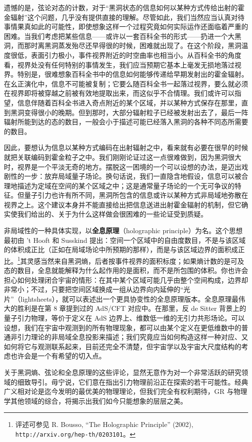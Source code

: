 遗憾的是，弦论对态的计数，对于“黑洞状态的信息如何以某种方式传给出射的霍金辐射”这个问题，几乎没有提供直接的理解。尽管如此，我们当然应当认真对待事情果真如此的可能性，即使想象这样一个过程究竟如何实际运作还面临着严重的困难。当我们考虑把某些信息——或许以一套百科全书的形式——扔进一个大黑洞，而那时离黑洞蒸发殆尽还早得很的时候，困难就出现了。在这个阶段，黑洞温度很低，表面引力极小，事件视界附近的时空曲率也相当小。从百科全书的角度看，视界处没有任何特别的事情发生，我们应当预期它基本上毫发无损地落过视界。特别是，很难想象百科全书中的信息如何能够传递给早期发射出的霍金辐射。在幺正演化中，信息不可能被复制；它要么随百科全书一起落过视界，要么就必须在视界即将被穿越之前被有效地提取出来，而这似乎不合情理。我们或许可以指望，信息伴随着百科全书进入奇点附近的某个区域，并以某种方式保存在那里，直到黑洞变得很小的晚期。但到那时，大部分辐射粒子已经被发射出去了，最后一阵辐射所能到达的态的数目，一般会小于描述可能已经落入黑洞的各种不同态所需要的数目。

因此，要想认为信息以某种方式编码在出射辐射之中，看来就有必要在很早的时候就把关联编码到霍金粒子之中。我们刚刚论证过这一点很难做到，因为黑洞很大时，视界是一个平淡无奇的地方。摆脱这一困境的一个可以设想的办法，是迈出戏剧性的一步：放弃局域量子场论。换句话说，我们一直隐含地假设，信息可以被合理地描述为定域在空间的某个区域之中；这是通常量子场论的一个无可争议的特征。但量子引力也许有所不同，黑洞所包含的信息或许以某种方式非局域地弥散在视界之上。这个建议本身并不能直接给出把信息送进出射霍金辐射的机制，但它确实使我们给出的、关于为什么这样做会很困难的一些论证受到质疑。

非局域性的一种具体实现，以\textbf{全息原理}（holographic principle）为名。这个思想最初由 't Hooft 和 Susskind 提出：空间一个区域中的自由度数目，不是与该区域的体积成正比（正如在局域场论中所预期的那样），而是与该区域边界的面积成正比。\footnote{评述可参见 R. Bousso, “The Holographic Principle” (2002), \texttt{http://arxiv.org/hep-th/0203101}。}其灵感当然来自黑洞熵，后者按事件视界的面积标度；如果熵计数的是可及态的数目，全息就能解释为什么起作用的是面积，而不是所包围的体积。你也许会担心如何处理闭合宇宙的情形：在其中某个区域可能几乎由整个空间构成，边界却非常小；不过，只要把空间区域换成一组从边界向内延伸的“光片”（lightsheets），就可以表述出一个更具协变性的全息原理版本。全息原理最伟大的胜利是在第 8 章提到过的 AdS/CFT 对应中。在那里，反 de Sitter 背景上的量子引力物理，等价于定义在 AdS 边界上、维数低一维的无引力共形场论。可以设想，我们在宇宙中观测到的所有物理现象，都可以由某个定义在更低维数中的普通非引力理论的非局域全息投影来描述；我们究竟应当如何构造这样一种对应、又如何将它与观测联系起来，目前还完全不清楚，但宇宙学以及宇宙大尺度结构的考虑也许会是一个有希望的切入点。

关于黑洞熵、弦论和全息原理的这些评论，显然无意作为对一个非常活跃的研究领域的细致导引。毋宁说，它们意在指出引力物理前沿正在探索的若干可能性。经典广义相对论是迄今发明的最优美的物理理论，但我们完全有权利期待，GR 与物理学其他领域的综合，将揭示出我们如今只能想象的层层之美。
